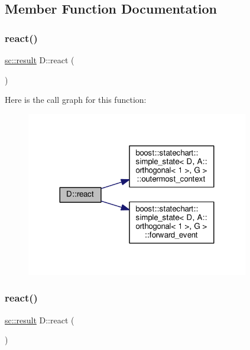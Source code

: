 \subsection{Member Function Documentation}
\mbox{\label{struct_d_a001e792488b9baf1e1c0a835961ad5b8}} 
\subsubsection{\texorpdfstring{react()}{react()}\hspace{0.1cm}{\footnotesize\ttfamily [1/3]}}
{\footnotesize\ttfamily \mbox{\hyperlink{namespaceboost_1_1statechart_abe807f6598b614d6d87bb951ecd92331}{sc\+::result}} D\+::react (\begin{DoxyParamCaption}\item[{const \mbox{\hyperlink{struct_ev_discard_never}{Ev\+Discard\+Never}} \&}]{ }\end{DoxyParamCaption})\hspace{0.3cm}{\ttfamily [inline]}}

Here is the call graph for this function\+:
\nopagebreak
\begin{figure}[H]
\begin{center}
\leavevmode
\includegraphics[width=275pt]{struct_d_a001e792488b9baf1e1c0a835961ad5b8_cgraph}
\end{center}
\end{figure}
\mbox{\label{struct_d_a975ef2b8a62e2b68e9af3640aa8d99b9}} 
\subsubsection{\texorpdfstring{react()}{react()}\hspace{0.1cm}{\footnotesize\ttfamily [2/3]}}
{\footnotesize\ttfamily \mbox{\hyperlink{namespaceboost_1_1statechart_abe807f6598b614d6d87bb951ecd92331}{sc\+::result}} D\+::react (\begin{DoxyParamCaption}\item[{const \mbox{\hyperlink{struct_ev_discard_in_b}{Ev\+Discard\+InB}} \&}]{ }\end{DoxyParamCaption})\hspace{0.3cm}{\ttfamily [inline]}}


